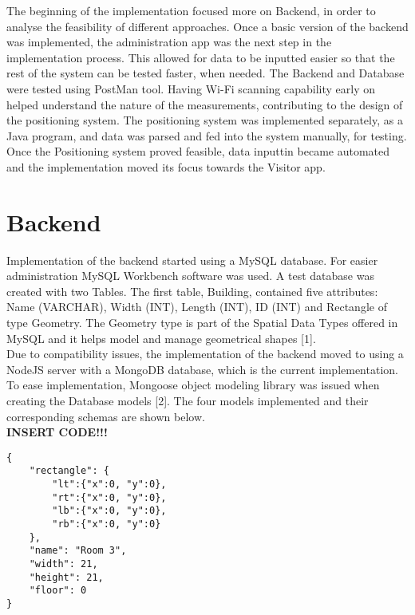 The beginning of the implementation focused more on Backend, in order to analyse the feasibility of different approaches. Once a basic version of the backend was implemented, the administration app was the next step in the implementation process. This allowed for data to be inputted easier so that the rest of the system can be tested faster, when needed. The Backend and Database were tested using PostMan tool. Having Wi-Fi scanning capability early on helped understand the nature of the measurements, contributing to the design of the positioning system. The positioning system was implemented separately, as a Java program, and data was parsed and fed into the system manually, for testing. Once the Positioning system proved feasible, data inputtin became automated and the implementation moved its focus towards the Visitor app.

\section{Backend}
Implementation of the backend started using a MySQL database. For easier administration MySQL Workbench software was used. A test database was created with two Tables. The first table, Building, contained five attributes: Name (VARCHAR), Width (INT), Length (INT), ID (INT) and Rectangle of type Geometry. The Geometry type is part of the Spatial Data Types offered in MySQL and it helps model and manage geometrical shapes [1].
\\
Due to compatibility issues, the implementation of the backend moved to using a NodeJS server with a MongoDB database, which is the current implementation.
To ease implementation, Mongoose object modeling library was issued when creating the Database models [2]. The four models implemented and their corresponding schemas are shown below. 
\\
\textbf{INSERT CODE!!!}
\\
\begin{lstlisting}
{
    "rectangle": {
        "lt":{"x":0, "y":0},
        "rt":{"x":0, "y":0},
        "lb":{"x":0, "y":0},
        "rb":{"x":0, "y":0}
    },
    "name": "Room 3",
    "width": 21,
    "height": 21,
    "floor": 0
}
\end{lstlisting}


